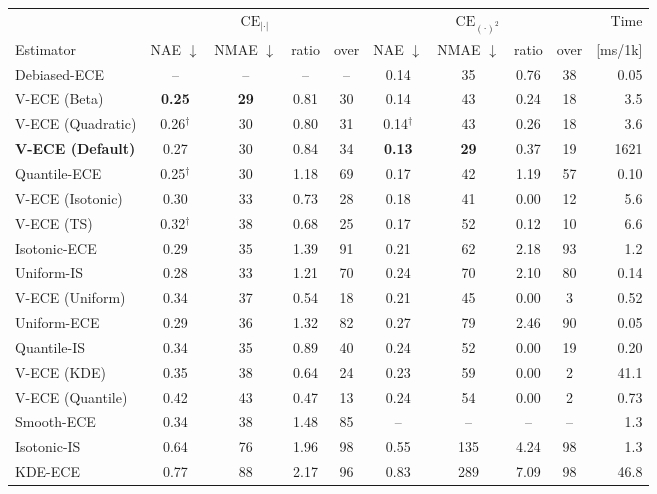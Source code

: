 \begin{tabular}{l cccc cccc r}
\toprule
& \multicolumn{4}{c}{$\mathrm{CE}_{|\cdot|}$} & \multicolumn{4}{c}{$\mathrm{CE}_{(\cdot)^2}$} & Time \\
\cmidrule(lr){2-5} \cmidrule(lr){6-9}
Estimator & NAE $\downarrow$ & NMAE $\downarrow$ & ratio & over & NAE $\downarrow$ & NMAE $\downarrow$ & ratio & over & [ms/1k] \\
\midrule
Debiased-ECE & -- & -- & -- & -- & 0.14 & 35 & 0.76 & 38 & 0.05 \\
V-ECE (Beta) & \textbf{0.25} & \textbf{29} & 0.81 & 30 & 0.14 & 43 & 0.24 & 18 & 3.5 \\
V-ECE (Quadratic) & 0.26$^\dagger$ & 30 & 0.80 & 31 & 0.14$^\dagger$ & 43 & 0.26 & 18 & 3.6 \\
\textbf{V-ECE (Default)} & 0.27 & 30 & 0.84 & 34 & \textbf{0.13} & \textbf{29} & 0.37 & 19 & 1621 \\
Quantile-ECE & 0.25$^\dagger$ & 30 & 1.18 & 69 & 0.17 & 42 & 1.19 & 57 & 0.10 \\
V-ECE (Isotonic) & 0.30 & 33 & 0.73 & 28 & 0.18 & 41 & 0.00 & 12 & 5.6 \\
V-ECE (TS) & 0.32$^\dagger$ & 38 & 0.68 & 25 & 0.17 & 52 & 0.12 & 10 & 6.6 \\
Isotonic-ECE & 0.29 & 35 & 1.39 & 91 & 0.21 & 62 & 2.18 & 93 & 1.2 \\
Uniform-IS & 0.28 & 33 & 1.21 & 70 & 0.24 & 70 & 2.10 & 80 & 0.14 \\
V-ECE (Uniform) & 0.34 & 37 & 0.54 & 18 & 0.21 & 45 & 0.00 & 3 & 0.52 \\
Uniform-ECE & 0.29 & 36 & 1.32 & 82 & 0.27 & 79 & 2.46 & 90 & 0.05 \\
Quantile-IS & 0.34 & 35 & 0.89 & 40 & 0.24 & 52 & 0.00 & 19 & 0.20 \\
V-ECE (KDE) & 0.35 & 38 & 0.64 & 24 & 0.23 & 59 & 0.00 & 2 & 41.1 \\
V-ECE (Quantile) & 0.42 & 43 & 0.47 & 13 & 0.24 & 54 & 0.00 & 2 & 0.73 \\
Smooth-ECE & 0.34 & 38 & 1.48 & 85 & -- & -- & -- & -- & 1.3 \\
Isotonic-IS & 0.64 & 76 & 1.96 & 98 & 0.55 & 135 & 4.24 & 98 & 1.3 \\
KDE-ECE & 0.77 & 88 & 2.17 & 96 & 0.83 & 289 & 7.09 & 98 & 46.8 \\
\bottomrule
\end{tabular}
